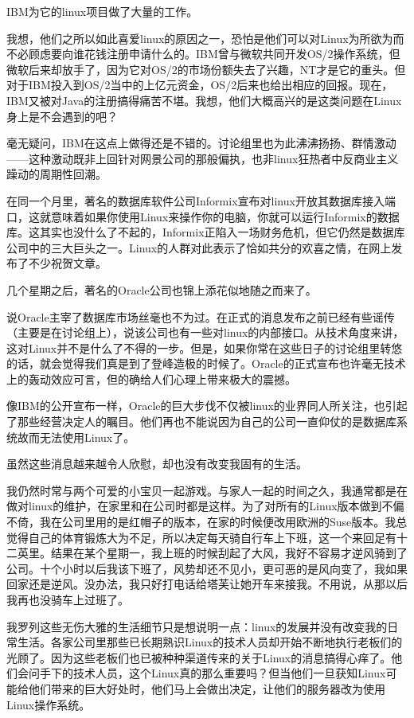 IBM为它的linux项目做了大量的工作。

我想，他们之所以如此喜爱linux的原因之一，恐怕是他们可以对Linux为所欲为而不必顾虑要向谁花钱注册申请什么的。IBM曾与微软共同开发OS/2操作系统，但微软后来却放手了，因为它对OS/2的市场份额失去了兴趣，NT才是它的重头。但对于IBM投入到OS/2当中的上亿元资金，OS/2后来也给出相应的回报。现在，IBM又被对Java的注册搞得痛苦不堪。我想，他们大概高兴的是这类问题在Linux身上是不会遇到的吧？

毫无疑问，IBM在这点上做得还是不错的。讨论组里也为此沸沸扬扬、群情激动——这种激动既非上回针对网景公司的那般偏执，也非linux狂热者中反商业主义躁动的周期性回潮。

在同一个月里，著名的数据库软件公司Informix宣布对linux开放其数据库接入端口，这就意味着如果你使用Linux来操作你的电脑，你就可以运行Informix的数据库。这其实也没什么了不起的，Informix正陷入一场财务危机，但它仍然是数据库公司中的三大巨头之一。Linux的人群对此表示了恰如共分的欢喜之情，在网上发布了不少祝贺文章。

几个星期之后，著名的Oracle公司也锦上添花似地随之而来了。

说Oracle主宰了数据库市场丝毫也不为过。在正式的消息发布之前已经有些谣传（主要是在讨论组上），说该公司也有一些对linux的内部接口。从技术角度来讲，这对Linux并不是什么了不得的一步。但是，如果你常在这些日子的讨论组里转悠的话，就会觉得我们真是到了登峰造极的时候了。Oracle的正式宣布也许毫无技术上的轰动效应可言，但的确给人们心理上带来极大的震撼。

像IBM的公开宣布一样，Oracle的巨大步伐不仅被linux的业界同人所关注，也引起了那些经营决定人的瞩目。他们再也不能说因为自己的公司一直仰仗的是数据库系统故而无法使用Linux了。

虽然这些消息越来越令人欣慰，却也没有改变我固有的生活。

我仍然时常与两个可爱的小宝贝一起游戏。与家人一起的时间之久，我通常都是在做对linux的维护，在家里和在公司时都是这样。为了对所有的Linux版本做到不偏不倚，我在公司里用的是红帽子的版本，在家的时候便改用欧洲的Suse版本。我总觉得自己的体育锻炼大为不足，所以决定每天骑自行车上下班，这一个来回足有十二英里。结果在某个星期一，我上班的时候刮起了大风，我好不容易才逆风骑到了公司。十个小时以后我该下班了，风势却还不见小，更可恶的是风向变了，我如果回家还是逆风。没办法，我只好打电话给塔芙让她开车来接我。不用说，从那以后我再也没骑车上过班了。

我罗列这些无伤大雅的生活细节只是想说明一点：linux的发展并没有改变我的日常生活。各家公司里那些已长期熟识Linux的技术人员却开始不断地执行老板们的光顾了。因为这些老板们也已被种种渠道传来的关于Linux的消息搞得心痒了。他们会问手下的技术人员，这个Linux真的那么重要吗？但当他们一旦获知Linux可能给他们带来的巨大好处时，他们马上会做出决定，让他们的服务器改为使用Linux操作系统。

